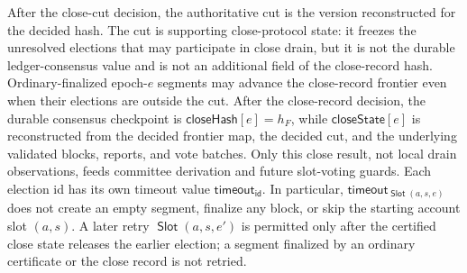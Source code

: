 \documentclass[sigplan,twocolumn,review,anonymous]{acmart}
\newcommand{\func}[1]{\operatorname{\mathsf{#1}}}
\newcommand{\id}{\mathsf{id}}
\newcommand{\Slot}{\func{Slot}}
\newcommand{\timeoutVal}{\mathsf{timeout}}
\newcommand{\closeHash}{\mathsf{closeHash}}
\newcommand{\closeState}{\mathsf{closeState}}
\begin{document}
After the close-cut decision, the authoritative cut is the version reconstructed for the decided hash.
The cut is supporting close-protocol state: it freezes the unresolved elections that may participate in
close drain, but it is not the durable ledger-consensus value and is not an additional field of the
close-record hash.  Ordinary-finalized epoch-\(e\) segments may advance the close-record frontier even
when their elections are outside the cut.  After the close-record decision, the durable consensus
checkpoint is \(\closeHash[e]=h_F\), while \(\closeState[e]\) is reconstructed from the decided frontier
map, the decided cut, and the underlying validated blocks, reports, and vote batches.  Only this close
result, not local drain observations, feeds committee derivation and future slot-voting guards.  Each election id has its own timeout value
\(\timeoutVal_\id\).  In particular, \(\timeoutVal_{\Slot(a,s,e)}\) does not create an empty segment,
finalize any block, or skip the starting account slot \((a,s)\).  A later retry
\(\Slot(a,s,e')\) is permitted only after the certified close state releases the earlier election; a
segment finalized by an ordinary certificate or the close record is not retried.
\end{document}

